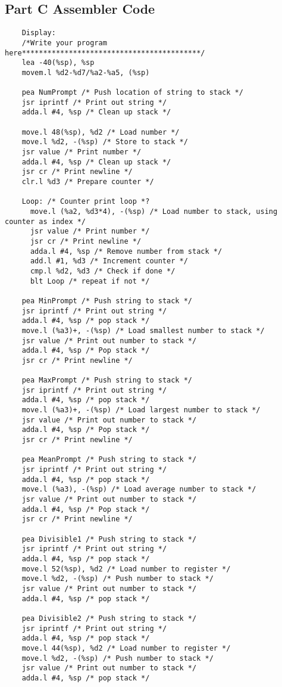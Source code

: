 \documentclass[10pt, letterpaper, titlepage]{article} %
\begin{document}
\subsection{Part C Assembler Code}
\begin{lstlisting}
	Display:
	/*Write your program here******************************************/
	lea -40(%sp), %sp
	movem.l %d2-%d7/%a2-%a5, (%sp)
	
	pea NumPrompt /* Push location of string to stack */
	jsr iprintf /* Print out string */
	adda.l #4, %sp /* Clean up stack */
	
	move.l 48(%sp), %d2 /* Load number */
	move.l %d2, -(%sp) /* Store to stack */
	jsr value /* Print number */
	adda.l #4, %sp /* Clean up stack */
	jsr cr /* Print newline */
	clr.l %d3 /* Prepare counter */
	
	Loop: /* Counter print loop *?
	  move.l (%a2, %d3*4), -(%sp) /* Load number to stack, using counter as index */
	  jsr value /* Print number */
	  jsr cr /* Print newline */
	  adda.l #4, %sp /* Remove number from stack */
	  add.l #1, %d3 /* Increment counter */
	  cmp.l %d2, %d3 /* Check if done */
	  blt Loop /* repeat if not */
	
	pea MinPrompt /* Push string to stack */
	jsr iprintf /* Print out string */
	adda.l #4, %sp /* pop stack */
	move.l (%a3)+, -(%sp) /* Load smallest number to stack */
	jsr value /* Print out number to stack */
	adda.l #4, %sp /* Pop stack */
	jsr cr /* Print newline */
	
	pea MaxPrompt /* Push string to stack */
	jsr iprintf /* Print out string */
	adda.l #4, %sp /* pop stack */
	move.l (%a3)+, -(%sp) /* Load largest number to stack */
	jsr value /* Print out number to stack */
	adda.l #4, %sp /* Pop stack */
	jsr cr /* Print newline */
	
	pea MeanPrompt /* Push string to stack */
	jsr iprintf /* Print out string */
	adda.l #4, %sp /* pop stack */
	move.l (%a3), -(%sp) /* Load average number to stack */
	jsr value /* Print out number to stack */
	adda.l #4, %sp /* Pop stack */
	jsr cr /* Print newline */
	
	pea Divisible1 /* Push string to stack */
	jsr iprintf /* Print out string */
	adda.l #4, %sp /* pop stack */
	move.l 52(%sp), %d2 /* Load number to register */
	move.l %d2, -(%sp) /* Push number to stack */
	jsr value /* Print out number to stack */
	adda.l #4, %sp /* pop stack */
	
	pea Divisible2 /* Push string to stack */
	jsr iprintf /* Print out string */
	adda.l #4, %sp /* pop stack */
	move.l 44(%sp), %d2 /* Load number to register */
	move.l %d2, -(%sp) /* Push number to stack */
	jsr value /* Print out number to stack */
	adda.l #4, %sp /* pop stack */
	

\end{lstlisting}
\end{document}

